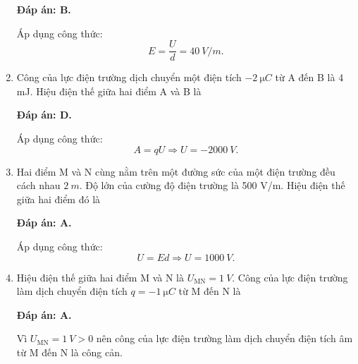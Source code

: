 \begin{enumerate}[label=\bfseries Câu \arabic*:]
{	}
	\loigiai
	{	\textbf{Đáp án: B.}
		
		Áp dụng công thức:
		$$E=\dfrac{U}{d} = \SI{40}{V/m}.$$
	}
	\item {}
	
	\cauhoi
	{Công của lực điện trường dịch chuyển một điện tích $\SI{-2}{\micro C}$ từ A đến B là 4 mJ. Hiệu điện thế giữa hai điểm A và B là
		
	}
	\loigiai
	{	\textbf{Đáp án: D.}
		
		Áp dụng công thức:
		$$A=qU \Rightarrow U = \SI{-2000}{V}.$$
	}
	\item {}
	
	\cauhoi
	{Hai điểm M và N cùng nằm trên một đường sức của một điện trường đều cách nhau $\SI{2}{m}$. Độ lớn của cường độ điện trường là 500 V/m. Hiệu điện thế giữa hai điểm đó là
		
	}
	\loigiai
	{	\textbf{Đáp án: A.}
		
		Áp dụng công thức:
	$$U=Ed \Rightarrow U = \SI{1000}{V}.$$
	}
	\item {}
	
	\cauhoi
	{Hiệu điện thế giữa hai điểm M và N là $U_\text{MN} = \SI{1}{V}$. Công của lực điện trường làm dịch chuyển điện tích $q=\SI{-1}{\micro C}$ từ M đến N là
		
	}
	\loigiai
	{	\textbf{Đáp án: A.}
		
		Vì $U_\text{MN} = \SI{1}{V} >0$ nên công của lực điện trường làm dịch chuyển điện tích âm từ M đến N là công cản.
		
}
\end{enumerate}
